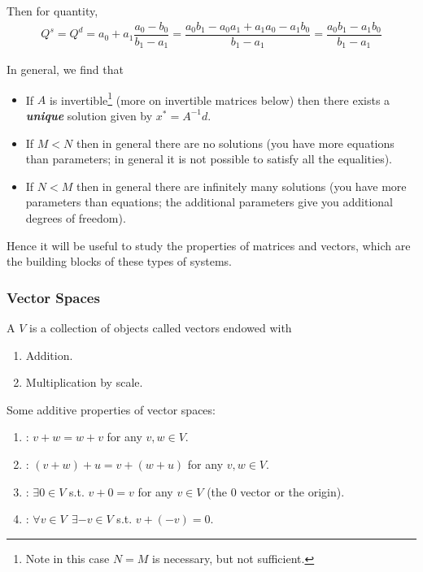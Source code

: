 \documentclass{article}
\begin{document}
Then for quantity,
\begin{align*}
  Q^s
  =
  Q^d
  =
  a_0 + a_1 \dfrac{a_0 - b_0}{b_1 - a_1}
  =
  \dfrac{a_0 b_1 - a_0 a_1 + a_1 a_0 - a_1 b_0}{b_1 - a_1}
  =
  \dfrac{a_0 b_1 - a_1 b_0}{b_1 - a_1}
\end{align*}

In general, we find that
\begin{itemize}[label=$\bullet$]
  \item If $A$ is invertible\footnote{Note in this case $N = M$ is necessary, but not sufficient.} (more on invertible matrices below) then there exists a \textbf{\textit{unique}} solution given by $x^* = A^{-1} d$.

  \item If $M < N$ then in general there are no solutions (you have more equations than parameters; in general it is not possible to satisfy all the equalities).

  \item If $N < M$ then in general there are infinitely many solutions (you have more parameters than equations; the additional parameters give you additional degrees of freedom).
\end{itemize}

Hence it will be useful to study the properties of matrices and vectors, which are the building blocks of these types of systems.

\subsubsection{Vector Spaces}
\label{ssub:vector_spaces}

\begin{definition}
  A  $V$ is a collection of objects called vectors endowed with
  \begin{enumerate}
    \item Addition.
    \item Multiplication by scale.
  \end{enumerate}
\end{definition}

Some additive properties of vector spaces:
\begin{enumerate}
  \item {}: $v + w = w + v$ for any $v, w \in V$.
  \item {}: $(v + w) + u = v + (w + u)$ for any $v, w \in V$.
  \item {}: $\exists 0 \in V$ s.t. $v + 0 = v$ for any $v \in V$ (the $0$ vector or the origin).
  \item {}: $\forall v \in V ~~ \exists -v \in V$ s.t. $v + (-v) = 0$.
\end{enumerate}
\end{document}
